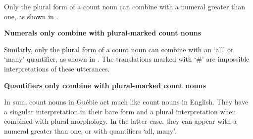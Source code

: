 \documentclass[output=paper,colorlinks,citecolor=brown]{langscibook}
\begin{document}
Only the plural form of a count noun can combine with a numeral greater than one, as shown in .

\ea%
    \label{ex:sande:4}
    \textbf{Numerals only combine with plural-marked count nouns}
    \z
\z

Similarly, only the plural form of a count noun can combine with an `all' or  `many' quantifier, as shown in . The translations marked with `\#' are impossible interpretations of these utterances.

\ea%
    \label{ex:sande:5}
    \textbf{Quantifiers only combine with plural-marked count nouns}
    \z
\z

In sum, count nouns in Guébie act much like count nouns in English. They have a singular interpretation in their bare form and a plural interpretation when combined with plural morphology. In the latter case, they can appear with a numeral greater than one, or with quantifiers `all, many'.
\end{document}
